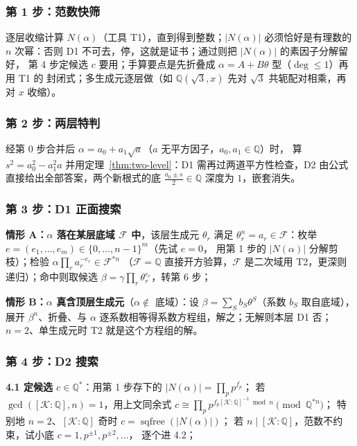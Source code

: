 \documentclass[UTF8,a4paper,11pt]{ctexart}
\begin{document}
\subsubsection{第 1 步：范数快筛}

逐层收缩计算 $N(\alpha)$（工具 T1），直到得到整数；$|N(\alpha)|$ 必须恰好是有理数的
$n$ 次幂：否则 D1 不可去，停，这就是证书；通过则把 $|N(\alpha)|$ 的素因子分解留好，
第 4 步定候选 $c$ 要用；手算要点是先折叠成 $\alpha=A+B\theta$ 型（$\deg\le1$）再用 T1 的
封闭式；多生成元逐层做（如 $\mathbb{Q}(\sqrt3,x)$ 先对 $\sqrt3$ 共轭配对相乘，再对 $x$ 收缩）。\par

\subsubsection{第 2 步：两层特判}

经第 0 步合并后 $\alpha=a_0+a_1\sqrt a$（$a$ 无平方因子，$a_0,a_1\in\mathbb{Q}$）时，
算 $s^2=a_0^2-a_1^2a$ 并用定理~\ref{thm:two-level}：D1 需再过两道平方性检查，D2 由公式
直接给出全部答案，两个新根式的底 $\tfrac{a_0\pm s}2\in\mathbb{Q}$ 深度为 $1$，嵌套消失。\par

\subsubsection{第 3 步：D1 正面搜索}

\textbf{情形 A：$\alpha$ 落在某层底域 $\mathscr{F}$ 中}，该层生成元 $\theta_r$ 满足
$\theta_r^n=a_r\in \mathscr{F}$：枚举 $e=(e_1,\dots,e_m)\in\{0,\dots,n-1\}^m$（先试 $e=0$，
用第 1 步的 $|N(\alpha)|$ 分解剪枝）；检验 $\alpha\prod_ra_r^{-e_r}\in \mathscr{F}^{*n}$
（$\mathscr{F}=\mathbb{Q}$ 直接开方验算，$\mathscr{F}$ 是二次域用 T2，更深则递归）；命中则取候选
$\beta=\gamma\prod_r\theta_r^{e_r}$，转第 6 步；\par

\textbf{情形 B：$\alpha$ 真含顶层生成元}（$\alpha\notin$ 底域）：设
$\beta=\sum_Sb_S\theta^S$（系数 $b_S$ 取自底域），展开 $\beta^n$、折叠、与 $\alpha$
逐系数相等得系数方程组，解之；无解则本层 D1 否；$n=2$、单生成元时 T2 就是这个方程组的解。\par

\subsubsection{第 4 步：D2 搜索}

\textbf{4.1 定候选 $c\in\mathbb{Q}^*$}：用第 1 步存下的 $|N(\alpha)|=\prod_pp^{f_p}$；
若 $\gcd([\mathscr{K}:\mathbb{Q}],n)=1$，用上文同余式
$c\cong\prod_pp^{f_p[\mathscr{K}:\mathbb{Q}]^{-1}\bmod n}\pmod{\mathbb{Q}^{*n}}$；
特别地 $n=2$、$[\mathscr{K}:\mathbb{Q}]$ 奇时 $c=\operatorname{sqfree}(|N(\alpha)|)$；
若 $n\mid[\mathscr{K}:\mathbb{Q}]$，范数不约束，试小底 $c=1,p^{\pm1},p^{\pm2},\dots$，
逐个进 4.2；\par
\end{document}
